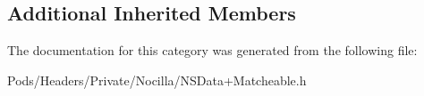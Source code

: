 \subsection*{Additional Inherited Members}


The documentation for this category was generated from the following file\-:\begin{DoxyCompactItemize}
\item 
Pods/\-Headers/\-Private/\-Nocilla/N\-S\-Data+\-Matcheable.\-h\end{DoxyCompactItemize}
